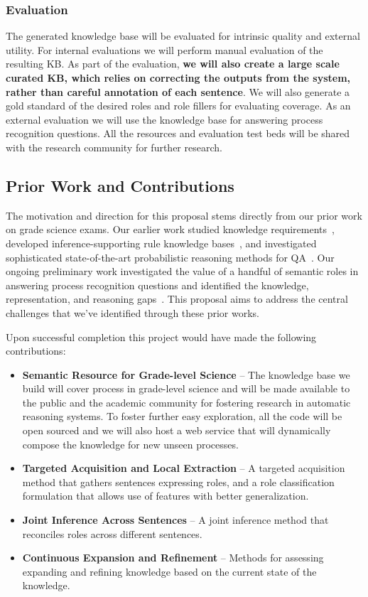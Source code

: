 \subsubsection*{Evaluation}

The generated knowledge base will be evaluated for intrinsic quality and external utility. For internal evaluations we will perform manual evaluation of the resulting KB. As part of the evaluation, {\bf we will also create a large scale curated KB, which relies on correcting the outputs from the system, rather than careful annotation of each sentence}. We will also generate a gold standard of the desired roles and role fillers for evaluating coverage. As an external evaluation we will use the knowledge base for answering process recognition questions. All the resources and evaluation test beds will be shared with the research community for further research.

\subsection{Prior Work and Contributions}

The motivation and direction for this proposal stems directly from our prior work on grade science exams.  Our earlier work studied knowledge requirements~\cite{chb2013:akbc}, developed inference-supporting rule knowledge bases~\cite{clark2014:akbc}, and investigated sophisticated state-of-the-art probabilistic reasoning methods for QA~\cite{khot2015:emlnlp}. Our ongoing preliminary work investigated the value of a handful of semantic roles in answering process recognition questions and identified the knowledge, representation, and reasoning gaps~\cite{louvan2015:kcap}. This proposal aims to address the central challenges that we've identified through these prior works.

Upon successful completion this project would have made the following contributions:
\begin{itemize}
\item {\bf Semantic Resource for Grade-level Science} -- The knowledge base we build will cover process in grade-level science and will be made available to the public and the academic community 
for fostering research in automatic reasoning systems. To foster further easy exploration, all the code will be open sourced and we will also host a web service that will dynamically compose the knowledge for new unseen processes. 
\item {\bf Targeted Acquisition and Local Extraction} -- A targeted acquisition method that gathers sentences expressing roles, and a role classification formulation that allows use of features with better generalization.
\item {\bf Joint Inference Across Sentences} -- A joint inference method that reconciles roles across different sentences.  
\item {\bf Continuous Expansion and Refinement} -- Methods for assessing expanding and refining knowledge based on the current state of the knowledge.
\end{itemize}



